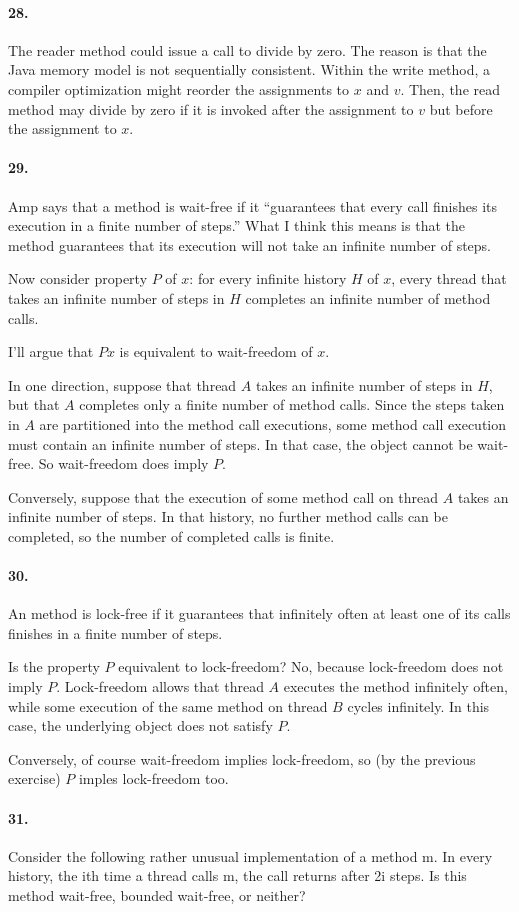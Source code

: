 \documentclass[
]{article}
\begin{document}
\paragraph{28.} The reader method could issue a call to divide by zero.  The reason is that the Java memory model is not sequentially consistent.  Within the write method, a compiler optimization might reorder the assignments to $x$ and $v$.  Then, the read method may divide by zero if it is invoked after the assignment to $v$ but before the assignment to $x$.

\paragraph{29.} Amp says that a method is wait-free if it ``guarantees that every call finishes its execution in a finite number of steps.''  What I think this means is that the method guarantees that its execution will not take an infinite number of steps.

Now consider property $P$ of $x$:  for every infinite history $H$ of $x$, every thread that takes an infinite number of steps in $H$ completes an infinite number of method calls.

I'll argue that $Px$ is equivalent to wait-freedom of $x$.

In one direction, suppose that thread $A$ takes an infinite number of steps in $H$, but that $A$ completes only a finite number of method calls.  Since the steps taken in $A$ are partitioned into the method call executions, some method call execution must contain an infinite number of steps.  In that case, the object cannot be wait-free.  So wait-freedom does imply $P$.

Conversely, suppose that the execution of some method call on thread $A$ takes an infinite number of steps.  In that history, no further method calls can be completed, so the number of completed calls is finite.

\paragraph{30.} An method is lock-free if it guarantees that infinitely often at least one of its calls finishes in a finite number of steps.  

Is the property $P$ equivalent to lock-freedom?  No, because lock-freedom does not imply $P$.  Lock-freedom allows that thread $A$ executes the method infinitely often, while some execution of the same method on thread $B$ cycles infinitely.  In this case, the underlying object does not satisfy $P$.  

Conversely, of course wait-freedom implies lock-freedom, so (by the previous exercise) $P$ imples lock-freedom too.

\paragraph{31.} Consider the following rather unusual implementation of a method m. In every history, the ith time a thread calls m, the call returns after 2i steps. Is this method wait-free, bounded wait-free, or neither?
\end{document}
